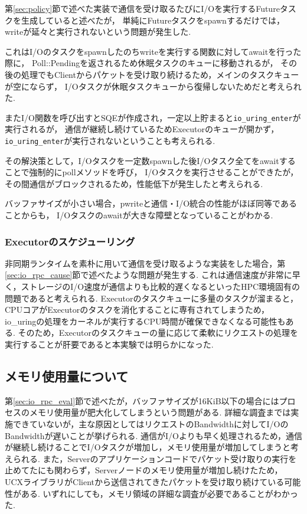 \documentclass[a4paper,11pt]{jreport}
\begin{document}
第\ref{sec:policy}節で述べた実装で通信を受け取るたびにI/Oを実行するFutureタスクを生成していると述べたが，
単純にFutureタスクをspawnするだけでは，writeが延々と実行されないという問題が発生した.

これはI/Oのタスクをspawnしたのちwriteを実行する関数に対してawaitを行った際に，
Poll::Pendingを返されるため休眠タスクのキューに移動されるが，
その後の処理でもClientからパケットを受け取り続けるため，メインのタスクキューが空にならず，
I/Oタスクが休眠タスクキューから復帰しないためだと考えられた.

またI/O関数を呼び出すとSQEが作成され，一定以上貯まると\lstinline|io_uring_enter|が実行されるが，
通信が継続し続けているためExecutorのキューが開かず，\lstinline|io_uring_enter|が実行されないということも考えられる.

その解決策として，I/Oタスクを一定数spawnした後I/Oタスク全てをawaitすることで強制的にpollメソッドを呼び，
I/Oタスクを実行させることができたが，その間通信がブロックされるため，性能低下が発生したと考えられる.

バッファサイズが小さい場合，pwriteと通信・I/O統合の性能がほぼ同等であることからも，
I/Oタスクのawaitが大きな障壁となっていることがわかる.

\subsubsection{Executorのスケジューリング}
非同期ランタイムを素朴に用いて通信を受け取るような実装をした場合，第\ref{sec:io_rpc_cause}節で述べたような問題が発生する.
これは通信速度が非常に早く，ストレージのI/O速度が通信よりも比較的遅くなるといったHPC環境固有の問題であると考えられる.
Executorのタスクキューに多量のタスクが溜まると，CPUコアがExecutorのタスクを消化することに専有されてしまうため，
io\_uringの処理をカーネルが実行するCPU時間が確保できなくなる可能性もある.
そのため，Executorのタスクキューの量に応じて柔軟にリクエストの処理を実行することが肝要であると本実験では明らかになった.

\subsection{メモリ使用量について}
第\ref{sec:io_rpc_eval}節で述べたが，バッファサイズが16KiB以下の場合にはプロセスのメモリ使用量が肥大化してしまうという問題がある.
詳細な調査までは実施できていないが，主な原因としてはリクエストのBandwidthに対してI/OのBandwidthが遅いことが挙げられる.
通信がI/Oよりも早く処理されるため，通信が継続し続けることでI/Oタスクが増加し，メモリ使用量が増加してしまうと考えられる.
また，Serverのアプリケーションコードでパケット受け取りの実行を止めてたにも関わらず，Serverノードのメモリ使用量が増加し続けたため，
UCXライブラリがClientから送信されてきたパケットを受け取り続けている可能性がある.
いずれにしても，メモリ領域の詳細な調査が必要であることがわかった.
\end{document}
